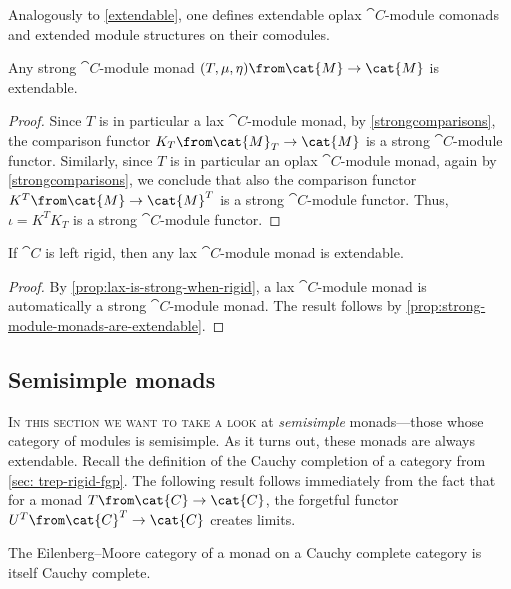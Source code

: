Analogously to \cref{extendable},
one defines extendable oplax \(\cat{C}\)\hyp{}module comonads
and extended module structures on their comodules.

\begin{proposition}\label{prop:strong-module-monads-are-extendable}
  Any strong \(\cat{C}\)\hyp{}module monad \((T, \mu, \eta)\from \cat{M} \to \cat{M}\) is extendable.
\end{proposition}
\begin{proof}
  Since \(T\) is in particular a lax \(\cat{C}\)\hyp{}module monad,
  by \cref{strongcomparisons}, the comparison functor \(K_T\from \cat{M}_T \to \cat{M}\) is a strong \(\cat{C}\)\hyp{}module functor.
  Similarly, since \(T\) is in particular an oplax \(\cat{C}\)\hyp{}module monad,
  again by \cref{strongcomparisons}, we conclude that also the comparison functor \(K^T\from \cat{M} \to \cat{M}^T\) is a strong \(\cat{C}\)\hyp{}module functor.
  Thus, \(\iota = K^T K_T\) is a strong \(\cat{C}\)\hyp{}module functor.
\end{proof}

\begin{corollary}
  If \(\cat{C}\) is left rigid, then any lax \(\cat{C}\)\hyp{}module monad is extendable.
\end{corollary}
\begin{proof}
  By \cref{prop:lax-is-strong-when-rigid},
  a lax \(\cat{C}\)\hyp{}module monad is automatically a strong \(\cat{C}\)\hyp{}module monad.
  The result follows by \cref{prop:strong-module-monads-are-extendable}.
\end{proof}

\subsection{Semisimple monads}\label{sec:semisimple-monads}

\textsc{In this section we want to take a look}
at \emph{semisimple} monads—those whose category of modules is semisimple.
As it turns out, these monads are always extendable.
Recall the definition of the Cauchy completion of a category from \cref{sec: trep-rigid-fgp}.
The following result follows immediately from the fact that
for a monad \(T\from \cat{C}\to \cat{C}\),
the forgetful functor \(U^T\from \cat{C}^T \to \cat{C}\) creates limits.

\begin{lemma}
  The Eilenberg--Moore category of a monad on a Cauchy complete category is itself Cauchy complete.
\end{lemma}

